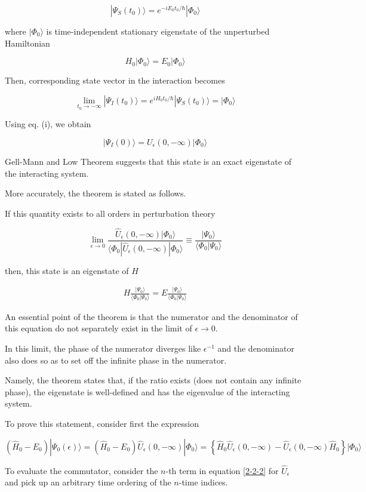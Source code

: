 \[|\Psi_S(t_0)\rangle = e^{-i E_0 t_0/\hbar}|\Phi_0\rangle \]

where $|\Phi_0\rangle$ is time-independent stationary eigenstate of the unperturbed Hamiltonian

\[H_0|\Phi_0\rangle = E_0|\Phi_0\rangle\]

Then, corresponding state vector in the interaction becomes 

\[\lim_{t_0\to-\infty}|\Psi_I(t_0)\rangle = e^{i H_0t_0/\hbar}|\Psi_S(t_0)\rangle = |\Phi_0\rangle \]

Using eq. (i), we obtain

\[|\Psi_I(0)\rangle = U_\epsilon (0,-\infty)|\Phi_0\rangle \]

Gell-Mann and Low Theorem suggests that this state is an exact eigenstate of the interacting system. 

More accurately, the theorem is stated as follows. 

If this quantity exists to all orders in perturbation theory

\[\lim_{\epsilon\to0}\frac{\hat{U}_\epsilon(0,-\infty)|\Phi_0\rangle}{\langle\Phi_0|\hat{U}_\epsilon(0,-\infty)|\Phi_0\rangle} \equiv \frac{|\Psi_0\rangle}{\langle\Phi_0|\Psi_0\rangle} \]

then, this state is an eigenstate of $H$

\begin{align}
H\frac{|\Psi_0\rangle}{\langle\Phi_0|\Psi_0\rangle} = E\frac{|\Psi_0\rangle}{\langle\Phi_0|\Psi_0\rangle}
\end{align}

An essential point of the theorem is that the numerator and the denominator of this equation do not separately exist in the limit of $\epsilon\to0$. 

In this limit, the phase of the numerator diverges like $\epsilon^{-1}$ and the denominator also does so as to set off the infinite phase in the numerator. 

Namely, the theorem states that, if the ratio exists (does not contain any infinite phase), the eigenstate is well-defined and has the eigenvalue of the interacting system. 

To prove this statement, consider first the expression

\[(\hat{H}_0-E_0)|\Psi_0(\epsilon)\rangle = (\hat{H}_0-E_0)\hat{U}_\epsilon(0,-\infty)|\Phi_0\rangle = \left\{\hat{H}_0\hat{U}_\epsilon(0,-\infty)-\hat{U}_\epsilon(0,-\infty)\hat{H}_0\right\}|\Phi_0\rangle \]

To evaluate the commutator, consider the $n$-th term in equation \eqref{2-2-2} for $\hat{U}_\epsilon$ and pick up an arbitrary time ordering of the $n$-time indices. 

